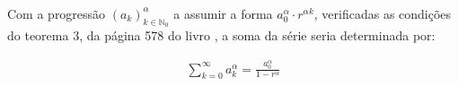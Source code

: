 \subsubsection{}

\paragraph{} Com a progressão $\left(a_k\right)^\alpha_{k \in \mathbb{N}_0}$ a
assumir a forma $a_0^\alpha \cdot r^{\alpha k}$, verificadas as condições do
teorema 3, da página 578 do livro \cite{santos2016calculo}, a soma da série
seria determinada por:

\begin{align*}
	\sum^{\infty}_{k = 0} a_k^\alpha = \frac{a_0^\alpha}{1 - r^\alpha}
\end{align*}



